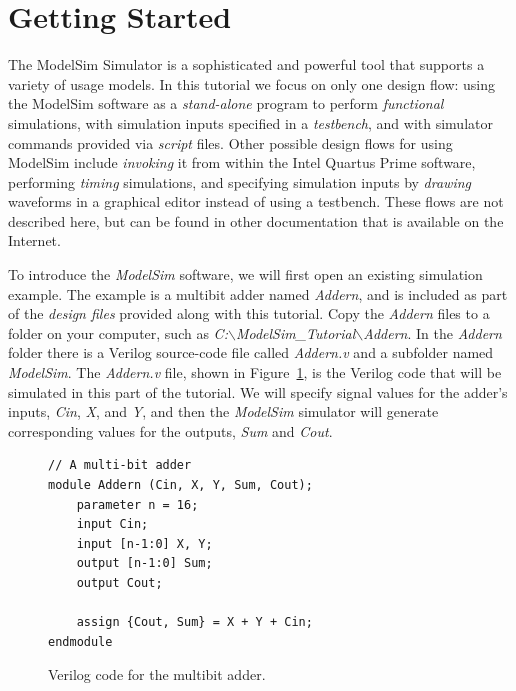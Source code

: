 \documentclass[11pt, twoside, pdftex]{article}
\begin{document}
\clearpage
\newpage
\section{Getting Started}

The ModelSim Simulator is a sophisticated and powerful tool that supports a variety of 
usage models. In this tutorial we focus on only one design flow: using the ModelSim
software as a {\it stand-alone} program to perform {\it functional} simulations, with 
simulation inputs specified in a {\it testbench}, and with simulator commands provided 
via {\it script} files. Other possible design flows for using ModelSim include {\it invoking}
it from within the Intel Quartus Prime software, performing {\it timing} simulations, and
specifying simulation inputs by {\it drawing} waveforms in a graphical editor instead of
using a testbench. These flows are not described here, but can be found in other
documentation that is available on the Internet.  

\noindent
To introduce the {\it ModelSim} software, we will first open an existing simulation example.
The example is a multibit adder named {\it Addern}, and is included as 
part of the {\it design files} provided
along with this tutorial. Copy the {\it Addern} files to a folder on your computer, such
as {\it C:$\backslash$ModelSim\_Tutorial$\backslash$Addern}. In the {\it Addern} folder
there is a Verilog source-code file called {\it Addern.v} and a subfolder named {\it ModelSim}.
The {\it Addern.v} file, shown in Figure~\ref{fig:addern}, is the Verilog code that will 
be simulated in this part of the tutorial. We will specify signal 
values for the adder's inputs, {\it Cin}, {\it X}, and {\it Y}, and then the {\it
ModelSim} simulator will generate corresponding values for the outputs, {\it Sum} and {\it Cout}.

\lstset{language=Verilog,numbers=none,escapechar=|}
\begin{figure}[h]
\begin{center}
\begin{minipage}[t]{12.5 cm}
\begin{lstlisting}[name=addern]
// A multi-bit adder
module Addern (Cin, X, Y, Sum, Cout);
    parameter n = 16;
    input Cin;
    input [n-1:0] X, Y;
    output [n-1:0] Sum;
    output Cout;

    assign {Cout, Sum} = X + Y + Cin;
endmodule
\end{lstlisting}
\end{minipage}
\caption{Verilog code for the multibit adder.}
\label{fig:addern}
\end{center}
\end{figure}
\end{document}
